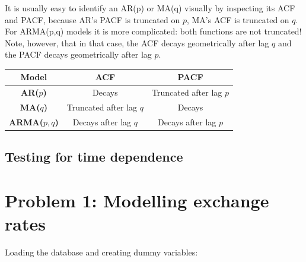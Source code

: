 \documentclass[11pt, a4paper]{report}
\newenvironment{Shaded}{\begin{snugshade}}{\end{snugshade}}
\newcommand{\DecValTok}[1]{\textcolor[rgb]{0.00,0.00,0.81}{#1}}
\newcommand{\KeywordTok}[1]{\textcolor[rgb]{0.13,0.29,0.53}{\textbf{#1}}}
\newcommand{\NormalTok}[1]{#1}
\newcommand{\OperatorTok}[1]{\textcolor[rgb]{0.81,0.36,0.00}{\textbf{#1}}}
\newcommand{\StringTok}[1]{\textcolor[rgb]{0.31,0.60,0.02}{#1}}
\theoremstyle{plain}
\theoremstyle{plain}
\theoremstyle{remark}
\begin{document}
It is usually easy to identify an AR(p) or MA(q) visually by inspecting its ACF and PACF, because AR's PACF is truncated on $p$, MA's ACF is truncated on $q$. For ARMA(p,q) models it is more complicated: both functions are not truncated! Note, however, that in that case, the ACF decays geometrically after lag $q$ and the PACF decays geometrically after lag $p$.

\vspace{1em}

\begin{center}


\begin{tabular}{|c|c|c|}
	\hline
	\textbf{Model}  &\textbf{ ACF }& \textbf{PACF} \\
	\hline
	\textbf{AR($p$)} & Decays & Truncated after lag $p$ \\
	\hline
	\textbf{MA($q$)} & Truncated after lag $q$ & Decays \\
	\hline
	\textbf{ARMA($p,q$)} & Decays after lag $q$ & Decays after lag $p$ \\
	\hline
\end{tabular}


\end{center}

\section{Testing for time dependence} %

\chapter{Problem 1: Modelling exchange rates}

Loading the database and creating dummy variables:

\begin{Shaded}
\end{Shaded}
\end{document}
